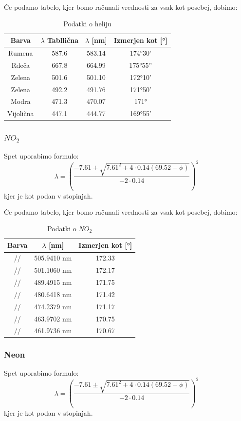 \documentclass[11pt, a4paper]{article}
\theoremstyle{definition}
\theoremstyle{example}
\theoremstyle{izrek}
\begin{document}
Če podamo tabelo, kjer bomo računali vrednosti za vsak kot posebej, dobimo:
\begin{table}[H]
	\centering
	\begin{tabular}{|c|c|c|c|}
		\hline
		Barva & $\lambda$ Tabllična &  $\lambda$ [nm] & Izmerjen kot [°] \\
		\hline
		\hline
		Rumena & 587.6 & 583.14 & 174°30' \\
		\hline
		Rdeča  & 667.8 & 664.99 & 175°55'' \\
		\hline
		Zelena & 501.6 & 501.10 & 172°10'\\
		\hline
		Zelena & 492.2 & 491.76& 171°50'\\  
		\hline
		Modra & 471.3 & 470.07 & 171°\\  
		\hline
		Vijolična & 447.1 & 444.77 & 169°55' \\  
		\hline
		\hline
	\end{tabular}
	\caption{Podatki o heliju}	
\end{table}

\subsubsection{$NO_2$}
Spet uporabimo formulo:
$$\lambda=\left(\frac{-7.61 \pm\sqrt{7.61^2+4 \cdot 0.14(69.52-\phi)}}{-2 \cdot 0.14}\right)^2$$
kjer je kot podan v stopinjah.

Če podamo tabelo, kjer bomo računali vrednosti za vsak kot posebej, dobimo:
\begin{table}[H]
	\centering
	\begin{tabular}{|c|c|c|}
		\hline
		Barva &  $\lambda$ [nm] & Izmerjen kot [°] \\
		\hline
		\hline
		// & 505.9410 nm & 172.33 \\ 
		\hline
 		// & 501.1060 nm & 172.17 \\ 
		\hline
 		// & 489.4915 nm & 171.75 \\ 
		\hline
 		// & 480.6418 nm & 171.42 \\ 
		\hline
 		// & 474.2379 nm & 171.17 \\ 
		\hline
 		// & 463.9702 nm & 170.75 \\ 
		\hline
 		// & 461.9736 nm & 170.67 \\ 
		\hline
	\end{tabular}
	\caption{Podatki o $NO_2$}	
\end{table}

\pagebreak
\subsubsection{Neon}
Spet uporabimo formulo:
$$\lambda=\left(\frac{-7.61 \pm\sqrt{7.61^2+4 \cdot 0.14(69.52-\phi)}}{-2 \cdot 0.14}\right)^2$$
kjer je kot podan v stopinjah.
\end{document}
